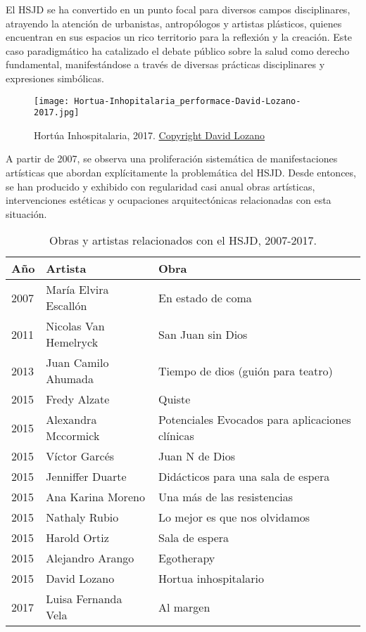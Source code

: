 El HSJD se ha convertido en un punto focal para diversos campos disciplinares, atrayendo la atención de urbanistas, antropólogos y artistas plásticos, quienes encuentran en sus espacios un rico territorio para la reflexión y la creación. Este caso paradigmático ha catalizado el debate público sobre la salud como derecho fundamental, manifestándose a través de diversas prácticas disciplinares y expresiones simbólicas.

\begin{figure}[h!]
    \centering
    \texttt{[image: Hortua-Inhopitalaria\_performace-David-Lozano-2017.jpg]}
    \caption{Hortúa Inhospitalaria, 2017. \href{https://david-lozano.org/work/hortua-inhospitalaria}{Copyright David Lozano}}
    \label{fig:david_lozano_hortua}
\end{figure}


A partir de 2007, se observa una proliferación sistemática de manifestaciones artísticas que abordan explícitamente la problemática del HSJD. Desde entonces, se han producido y exhibido con regularidad casi anual obras artísticas, intervenciones estéticas y ocupaciones arquitectónicas relacionadas con esta situación.

\begin{table}[h!]
\centering
\begin{tabular}{|l|l|l|}
\hline
\textbf{Año} & \textbf{Artista} & \textbf{Obra} \\ \hline
2007 & María Elvira Escallón & En estado de coma \\ \hline
2011 & Nicolas Van Hemelryck & San Juan sin Dios \\ \hline
2013 & Juan Camilo Ahumada & Tiempo de dios (guión para teatro) \\ \hline
2015 & Fredy Alzate & Quiste \\ \hline
2015 & Alexandra Mccormick & Potenciales Evocados para aplicaciones clínicas \\ \hline
2015 & Víctor Garcés & Juan N de Dios \\ \hline
2015 & Jenniffer Duarte & Didácticos para una sala de espera \\ \hline
2015 & Ana Karina Moreno & Una más de las resistencias \\ \hline
2015 & Nathaly Rubio & Lo mejor es que nos olvidamos \\ \hline
2015 & Harold Ortiz & Sala de espera \\ \hline
2015 & Alejandro Arango & Egotherapy \\ \hline
2015 & David Lozano & Hortua inhospitalario \\ \hline
2017 & Luisa Fernanda Vela & Al margen \\ \hline
\end{tabular}
\caption{Obras y artistas relacionados con el HSJD, 2007-2017.}
\label{tabla:obras_artistas}
\end{table}

